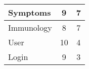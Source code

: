 \begin{table}[!h]
\begin{tabular}{|l|c|c|}
Symptoms                                                       & 9                                                                                              & 7                                                                                        \\ \hline
Immunology                                                     & 8                                                                                              & 7                                                                                        \\ \hline
User                                                           & 10                                                                                             & 4                                                                                        \\ \hline
Login                                                          & 9                                                                                              & 3                                                                                        \\ \hline
\end{tabular}
\end{table}